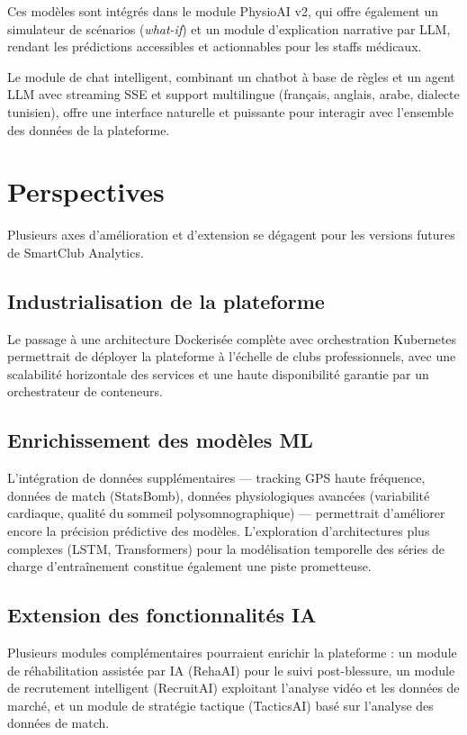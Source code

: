\documentclass{modificopy}
\begin{document}
Ces modèles sont intégrés dans le module PhysioAI v2, qui offre également un simulateur de scénarios (\textit{what-if}) et un module d'explication narrative par LLM, rendant les prédictions accessibles et actionnables pour les staffs médicaux.

Le module de chat intelligent, combinant un chatbot à base de règles et un agent LLM avec streaming SSE et support multilingue (français, anglais, arabe, dialecte tunisien), offre une interface naturelle et puissante pour interagir avec l'ensemble des données de la plateforme.

\section*{Perspectives}

Plusieurs axes d'amélioration et d'extension se dégagent pour les versions futures de SmartClub Analytics.

\subsection*{Industrialisation de la plateforme}

Le passage à une architecture Dockerisée complète avec orchestration Kubernetes permettrait de déployer la plateforme à l'échelle de clubs professionnels, avec une scalabilité horizontale des services et une haute disponibilité garantie par un orchestrateur de conteneurs.

\subsection*{Enrichissement des modèles ML}

L'intégration de données supplémentaires — tracking GPS haute fréquence, données de match (StatsBomb), données physiologiques avancées (variabilité cardiaque, qualité du sommeil polysomnographique) — permettrait d'améliorer encore la précision prédictive des modèles. L'exploration d'architectures plus complexes (LSTM, Transformers) pour la modélisation temporelle des séries de charge d'entraînement constitue également une piste prometteuse.

\subsection*{Extension des fonctionnalités IA}

Plusieurs modules complémentaires pourraient enrichir la plateforme : un module de réhabilitation assistée par IA (RehaAI) pour le suivi post-blessure, un module de recrutement intelligent (RecruitAI) exploitant l'analyse vidéo et les données de marché, et un module de stratégie tactique (TacticsAI) basé sur l'analyse des données de match.
\end{document}
